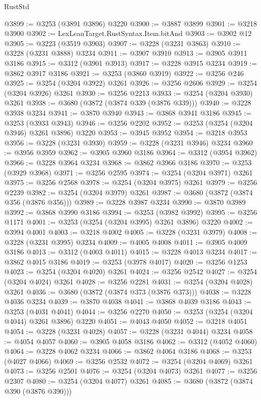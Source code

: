 \begin{lexlean}{RustStd}
\begin{coremodule}
@3899 := @3253 (@3891 @3896) @3220
@3900 := @3887 @3899
@3901 := @3218 @3900
@3902 := LexLeanTarget.RustSyntax.Item.bitAnd
@3903 := @3902 @12
@3905 := @3223 (@3519 @3903)
@3907 := @3228 (@3231 @3863)
@3910 := @3228 (@3231 @3888) @3234
@3911 := @3907 @3910
@3913 := @3905 @3911 @3186
@3915 := @3312 (@3901 @3913)
@3917 := @3228 @3915 @3234
@3919 := @3862 @3917 @3186
@3921 := @3253 (@3860 @3919)
@3922 := @3256 @246
@3925 := @3254 (@3204 @3922) @3261
@3926 := @3256 @2606
@3929 := @3254 (@3204 @3926) @3261
@3930 := @3256 @2213
@3933 := @3254 (@3204 @3930) @3261
@3938 := @3680 (@3872 (@3874 @339 (@3876 @339)))
@3940 := @3228 @3938 @3234
@3941 := @3870 @3940
@3943 := @3868 @3941 @3186
@3945 := @3253 (@3933 @3943)
@3946 := @3256 @2202
@3952 := @3253 (@3254 (@3204 @3946) @3261 @3896) @3220
@3953 := @3945 @3952
@3954 := @3218 @3953
@3956 := @3228 (@3231 @3930)
@3959 := @3228 (@3231 @3946) @3234
@3960 := @3956 @3959
@3962 := @3905 @3960 @3186
@3964 := @3312 (@3954 @3962)
@3966 := @3228 @3964 @3234
@3968 := @3862 @3966 @3186
@3970 := @3253 (@3929 @3968)
@3971 := @3256 @2595
@3974 := @3254 (@3204 @3971) @3261
@3975 := @3256 @2568
@3978 := @3254 (@3204 @3975) @3261
@3979 := @3256 @2239
@3982 := @3254 (@3204 @3979) @3261
@3987 := @3680 (@3872 (@3874 @356 (@3876 @356)))
@3989 := @3228 @3987 @3234
@3990 := @3870 @3989
@3992 := @3868 @3990 @3186
@3994 := @3253 (@3982 @3992)
@3995 := @3256 @1171
@4001 := @3253 (@3254 (@3204 @3995) @3261 @3896) @3220
@4002 := @3994 @4001
@4003 := @3218 @4002
@4005 := @3228 (@3231 @3979)
@4008 := @3228 (@3231 @3995) @3234
@4009 := @4005 @4008
@4011 := @3905 @4009 @3186
@4013 := @3312 (@4003 @4011)
@4015 := @3228 @4013 @3234
@4017 := @3862 @4015 @3186
@4019 := @3253 (@3978 @4017)
@4020 := @3256 @1253
@4023 := @3254 (@3204 @4020) @3261
@4024 := @3256 @2542
@4027 := @3254 (@3204 @4024) @3261
@4028 := @3256 @2281
@4031 := @3254 (@3204 @4028) @3261
@4036 := @3680 (@3872 (@3874 @373 (@3876 @373)))
@4038 := @3228 @4036 @3234
@4039 := @3870 @4038
@4041 := @3868 @4039 @3186
@4043 := @3253 (@4031 @4041)
@4044 := @3256 @2270
@4050 := @3253 (@3254 (@3204 @4044) @3261 @3896) @3220
@4051 := @4043 @4050
@4052 := @3218 @4051
@4054 := @3228 (@3231 @4028)
@4057 := @3228 (@3231 @4044) @3234
@4058 := @4054 @4057
@4060 := @3905 @4058 @3186
@4062 := @3312 (@4052 @4060)
@4064 := @3228 @4062 @3234
@4066 := @3862 @4064 @3186
@4068 := @3253 (@4027 @4066)
@4069 := @3256 @2532
@4072 := @3254 (@3204 @4069) @3261
@4073 := @3256 @2501
@4076 := @3254 (@3204 @4073) @3261
@4077 := @3256 @2307
@4080 := @3254 (@3204 @4077) @3261
@4085 := @3680 (@3872 (@3874 @390 (@3876 @390)))

\end{coremodule}
\end{lexlean}

